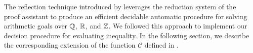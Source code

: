 The reflection technique introduced by \cite{reflection-origin-coq} leverages the reduction system of the proof assistant to produce an efficient decidable automatic
procedure for solving arithmetic goals over $\mathbb{Q}$, $\mathbb{R}$, and $\mathbb{Z}$. We followed this approach to implement our decision procedure for evaluating inequality.
In the following section, we describe the corresponding extension of the function $\mathcal{C}$ defined in \cite{ColtellacciMD24}.
